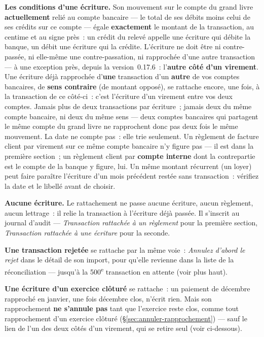 \documentclass[a4paper,11pt,oneside]{article}
\begin{document}
\textbf{Les conditions d'une écriture.} Son mouvement sur le compte du grand livre \textbf{actuellement} relié au compte bancaire --- le total de ses débits moins celui de ses crédits sur ce compte --- égale \textbf{exactement} le montant de la transaction, au centime et au signe près~: un crédit du relevé appelle une écriture qui débite la banque, un débit une écriture qui la crédite. L'écriture ne doit être ni contre-passée, ni elle-même une contre-passation, ni rapprochée d'une autre transaction --- à une exception près, depuis la version~0.17.6~: l'\textbf{autre côté d'un virement}. Une écriture déjà rapprochée d'\textbf{une} transaction d'un \textbf{autre} de vos comptes bancaires, de \textbf{sens contraire} (de montant opposé), se rattache encore, une fois, à la transaction de ce côté-ci~: c'est l'écriture d'un virement entre vos deux comptes. Jamais plus de deux transactions par écriture~; jamais deux du même compte bancaire, ni deux du même sens --- deux comptes bancaires qui partagent le même compte du grand livre ne rapprochent donc pas deux fois le même mouvement. La date ne compte pas~: elle trie seulement. Un règlement de facture client par virement sur ce même compte bancaire n'y figure pas --- il est dans la première section~; un règlement client par \textbf{compte interne} dont la contrepartie est le compte de la banque y figure, lui. Un même montant récurrent (un loyer) peut faire paraître l'écriture d'un mois précédent restée sans transaction~: vérifiez la date et le libellé avant de choisir.

\textbf{Aucune écriture.} Le rattachement ne passe aucune écriture, aucun règlement, aucun lettrage~: il relie la transaction à l'écriture déjà passée. Il s'inscrit au journal d'audit --- \emph{Transaction rattachée à un règlement} pour la première section, \emph{Transaction rattachée à une écriture} pour la seconde.

\textbf{Une transaction rejetée} se rattache par la même voie~: \emph{Annulez d'abord le rejet} dans le détail de son import, pour qu'elle revienne dans la liste de la réconciliation --- jusqu'à la 500\textsuperscript{e} transaction en attente (voir plus haut).

\textbf{Une écriture d'un exercice clôturé} se rattache~: un paiement de décembre rapproché en janvier, une fois décembre clos, n'écrit rien. Mais son rapprochement \textbf{ne s'annule pas} tant que l'exercice reste clos, comme tout rapprochement d'un exercice clôturé (\S\ref{sec:annuler-rapprochement}) --- sauf le lien de l'un des deux côtés d'un virement, qui se retire seul (voir ci-dessous).
\end{document}
